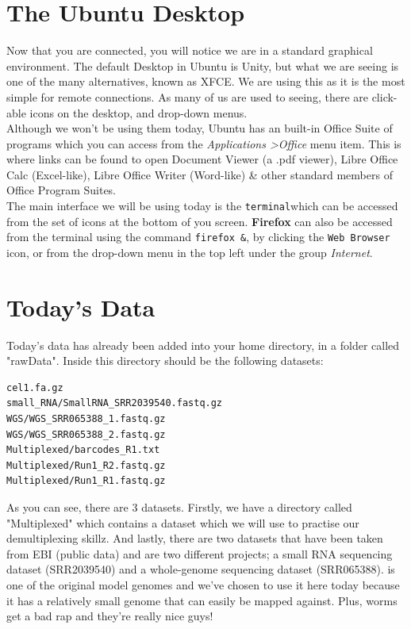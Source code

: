 \section{The Ubuntu Desktop}
\begin{note}
Now that you are connected, you will notice we are in a standard graphical environment.
The default Desktop in Ubuntu is Unity, but what we are seeing is one of the many alternatives, known as XFCE.
We are using this as it is the most simple for remote connections.
As many of us are used to seeing, there are click-able icons on the desktop, and drop-down menus. \\

Although we won't be using them today, Ubuntu has an built-in Office Suite of
programs which you can access from the \textit{Applications \textgreater Office} menu item.
This is where links can be found to open Document Viewer (a .pdf viewer), Libre Office Calc (Excel-like), Libre Office Writer (Word-like) \& other standard members of Office Program Suites. \\

The main interface we will be using today is the \texttt{terminal}which can be accessed from the set of icons at the bottom of you screen.
\textbf{Firefox} can also be accessed from the terminal using the command \texttt{firefox \&},  by clicking the \texttt{Web Browser} icon, or from the drop-down menu in the top left under the group \textit{Internet}.

\end{note}

\section{Today's Data}
\begin{note}
Today's data has already been added into your home directory, in a folder called "rawData". Inside this directory should be the following datasets:

\begin{lstlisting}
cel1.fa.gz
small_RNA/SmallRNA_SRR2039540.fastq.gz
WGS/WGS_SRR065388_1.fastq.gz
WGS/WGS_SRR065388_2.fastq.gz
Multiplexed/barcodes_R1.txt
Multiplexed/Run1_R2.fastq.gz
Multiplexed/Run1_R1.fastq.gz
\end{lstlisting}

As you can see, there are 3 datasets. Firstly, we have a directory called "Multiplexed" which contains a dataset which we will use to practise our demultiplexing skillz.
And lastly, there are two datasets that have been taken from EBI (public data) and are two different  projects; a small RNA sequencing dataset (SRR2039540) and a whole-genome sequencing dataset (SRR065388).
 is one of the original model genomes and we've chosen to use it here today because it has a relatively small genome that can easily be mapped against.
Plus, worms get a bad rap and they're really nice guys! \\
\end{note}

